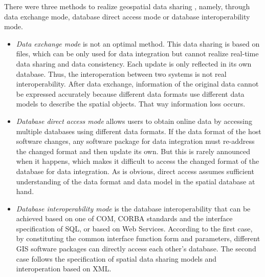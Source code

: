 \documentclass[12pt,a4paper]{report}
\newcommand{\term}{\textit}
\newcommand{\acr}{\MakeUppercase}
\begin{document}
	There were three methods to realize geospatial data sharing \citep{Shi}, 
	namely, through data exchange mode, database direct access mode or database 
	interoperability mode. 
	\begin{itemize} 
		\item \term{Data exchange mode} is not an optimal method. This data 
		sharing is based on files, which can be only used for data integration 
		but cannot realize real-time data sharing and data consistency. Each 
		update is only reflected in its own database. Thus, the interoperation 
		between two systems is not real interoperability. After data exchange, 
		information of the original data cannot be expressed accurately because 
		different data formats use different data models to describe the 
		spatial objects. That way information loss occurs.
		\item \term{Database direct access mode} allows users to obtain online 
		data by accessing multiple databases using different data formats. If 
		the data format of the host software changes, any software package for 
		data integration must re-address the changed format and then update 
		its own. But this is rarely announced when it happens, which makes it 
		difficult to access the changed format of the database for data 
		integration. As is obvious, direct access assumes sufficient 
		understanding of the data format and data model in the spatial database 
		at hand.
		\item \term{Database interoperability mode} is the database 
		interoperability that can be achieved based on one of \acr{com}, 
		\acr{corba} standards and the interface specification of \acr{sql}, or 
		based on Web Services. According to the first case, by constituting the 
		common interface function form and parameters, different \acr{gis} 
		software packages can directly access each other’s database. The second 
		case follows the specification of spatial data sharing models and 
		interoperation based on \acr{xml}.
	\end{itemize} 

	\renewcommand{\bibname}{References}
	
	
\end{document}
